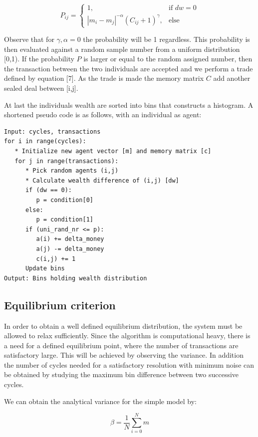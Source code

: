 \documentclass[a4paper,11pt]{article}
\begin{document}
\[
    P_{ij} = 
\begin{cases}
    1,& \text{if } dw = 0\\
    |m_i-m_j|^{-\alpha} (C_{ij}+1)^{\gamma},& \text{else}
\end{cases}
\]

Observe that for $\gamma,\alpha = 0$ the probability will be 1 regardless. This probability is then evaluated against a random sample number from a uniform distribution [0,1). If the probability $P$ is larger or equal to the random assigned number, then the transaction between the two individuals are accepted and we perform a trade defined by equation [7]. As the trade is made the memory matrix $C$ add another sealed deal between [i,j].
\\
\par
At last the individuals wealth are sorted into bins that constructs a histogram. A shortened pseudo code is as follows, with an individual as agent:
\\
\par
\begin{verbatim}
Input: cycles, transactions
for i in range(cycles):
   * Initialize new agent vector [m] and memory matrix [c]
   for j in range(transactions):
      * Pick random agents (i,j)
      * Calculate wealth difference of (i,j) [dw]
      if (dw == 0):
         p = condition[0]
      else:
         p = condition[1]
      if (uni_rand_nr <= p):
         a(i) += delta_money
         a(j) -= delta_money
         c(i,j) += 1
      Update bins
Output: Bins holding wealth distribution
\end{verbatim}

\subsection{Equilibrium criterion}
In order to obtain a well defined equilibrium distribution, the system must be allowed to relax sufficiently. Since the algorithm is computational heavy, there is a need for a defined equilibrium point, where the number of transactions are satisfactory large. This will be achieved by observing the variance. In addition the number of cycles needed for a satisfactory resolution with minimum noise can be obtained by studying the maximum bin difference between two successive cycles.
\\
\par
We can obtain the analytical variance for the simple model by:

\begin{equation}
\beta = \frac{1}{N} \sum_{i=0}^N m
\end{equation}
\end{document}
